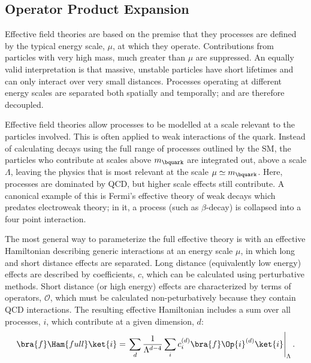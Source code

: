 \subsection{Operator Product Expansion}


Effective field theories are based on the premise that they processes are defined by the typical
energy scale, $\mu$, at which they operate.
Contributions from particles with very high mass, much greater than $\mu$ are suppressed.
An equally valid interpretation is that massive, unstable particles have short lifetimes and can
only interact over very small distances.
Processes operating at different energy scales are separated both spatially and temporally; and are
therefore decoupled.

Effective field theories allow processes to be modelled at a scale relevant to the particles
involved.
This is often applied to weak interactions of the \bquark quark.
Instead of calculating \bquark decays using the full range of processes outlined by the SM, the
particles who contribute at scales above $m_\bquark$ are integrated out, above a scale $\Lambda$,
leaving the physics that is most relevant at the scale $\mu\simeq m_\bquark$.
Here, processes are dominated by QCD, but higher scale effects still contribute.
A canonical example of this is Fermi's effective theory of weak decays which predates electroweak
theory; in it, a process (such as $\beta$-decay) is collapsed into a four point interaction.


The most general way to parameterize the full effective theory is with an effective Hamiltonian
describing generic
interactions at an energy scale $\mu$, in which long and short distance effects are separated.
Long distance (equivalently low energy) effects are described by coefficients, $c$, which can be
calculated using perturbative methods.
Short distance (or high energy) effects are characterized by terms of operators, $\mathcal{O}$,
which must be calculated non-peturbatively because they contain QCD interactions.
The resulting effective Hamiltonian includes a sum over all processes, $i$, which contribute at a
given dimension, $d$:
\begin{equation}
  \bra{f}\Ham{full}\ket{i} =
  \left.\sum_{d}\frac{1}{\Lambda^{d-4}}
  \sum_i c_i^{(d)}\bra{f}\Op{i}^{(d)}\ket{i}\right|_{\Lambda}.
\end{equation}





